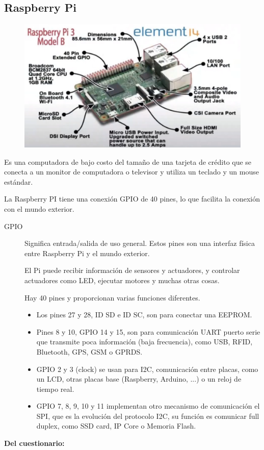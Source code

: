 \documentclass[12pt]{report} %
\begin{document}
\subsection{Raspberry Pi}

\begin{figure}[H]
	{\includegraphics[scale=.4]{2021-03-19 17_48_46-DSO Elementos Sistema embebido.mkv.png}}
\end{figure}

Es una computadora de bajo costo del tamaño de una tarjeta de crédito que se conecta a un monitor de computadora o televisor y utiliza un teclado y un mouse estándar.

La Raspberry PI tiene una conexión GPIO de 40 pines, lo que facilita la conexión con el mundo exterior.


\begin{description}
	\item[GPIO] Significa entrada/salida de uso general. Estos pines son una interfaz física entre Raspberry Pi y el mundo exterior. 
	
	El Pi puede recibir información de sensores y actuadores, y controlar actuadores como LED, ejecutar motores y muchas otras cosas.
	
	Hay 40 pines y proporcionan varias funciones diferentes. 
	\begin{itemize}
		\item Los pines 27 y 28, ID SD e ID SC, son para conectar una EEPROM.
		\item Pines 8 y 10, GPIO 14 y 15, son para comunicación UART puerto serie que transmite poca información (baja frecuencia), como USB, RFID, Bluetooth, GPS, GSM o GPRDS.
		\item GPIO 2 y 3 (clock) se usan para I2C, comunicación entre placas, como un LCD, otras placas base (Raspberry, Arduino, ...) o un reloj de tiempo real.
		\item GPIO 7, 8, 9, 10 y 11 implementan otro mecanismo de comunicación el SPI, que es la evolución del protocolo I2C, su función es comunicar full duplex, como SSD card, IP Core o Memoria Flash.
	\end{itemize}
		
\end{description}  
\textbf{Del cuestionario:}
\end{document}
